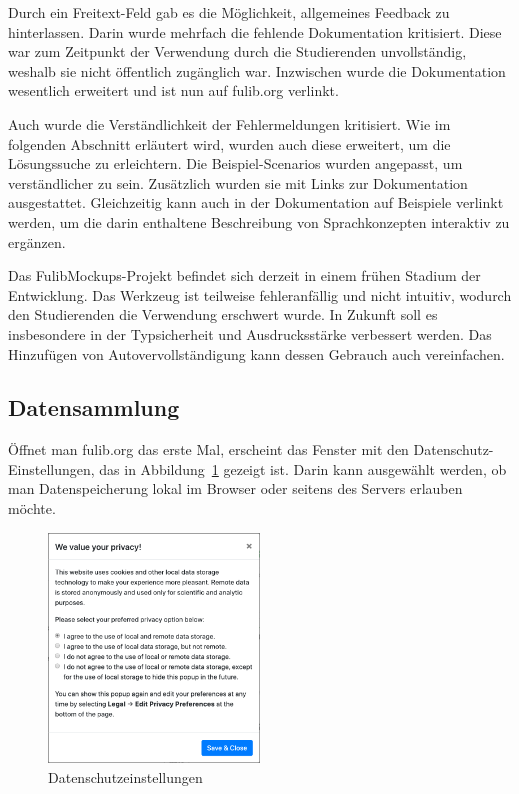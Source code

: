Durch ein Freitext-Feld gab es die Möglichkeit, allgemeines Feedback zu hinterlassen.
Darin wurde mehrfach die fehlende Dokumentation kritisiert.
Diese war zum Zeitpunkt der Verwendung durch die Studierenden unvollständig, weshalb sie nicht öffentlich zugänglich war.
Inzwischen wurde die Dokumentation wesentlich erweitert und ist nun auf fulib.org verlinkt.

Auch wurde die Verständlichkeit der Fehlermeldungen kritisiert.
Wie im folgenden Abschnitt erläutert wird, wurden auch diese erweitert, um die Lösungssuche zu erleichtern.
Die Beispiel-Scenarios wurden angepasst, um verständlicher zu sein.
Zusätzlich wurden sie mit Links zur Dokumentation ausgestattet.
Gleichzeitig kann auch in der Dokumentation auf Beispiele verlinkt werden, um die darin enthaltene Beschreibung von Sprachkonzepten interaktiv zu ergänzen.

Das FulibMockups-Projekt befindet sich derzeit in einem frühen Stadium der Entwicklung.
Das Werkzeug ist teilweise fehleranfällig und nicht intuitiv, wodurch den Studierenden die Verwendung erschwert wurde.
In Zukunft soll es insbesondere in der Typsicherheit und Ausdrucksstärke verbessert werden.
Das Hinzufügen von Autovervollständigung kann dessen Gebrauch auch vereinfachen.

\subsection{Datensammlung}\label{subsec:data-collection}

Öffnet man fulib.org das erste Mal, erscheint das Fenster mit den Datenschutz-Einstellungen, das in Abbildung~\ref{fig:privacy} gezeigt ist.
Darin kann ausgewählt werden, ob man Datenspeicherung lokal im Browser oder seitens des Servers erlauben möchte.

\begin{figure}
    \centering
    \includegraphics[width=0.5\textwidth]{chapter/fulib.org/img/privacy.png}
    \caption{Datenschutzeinstellungen}
    \label{fig:privacy}
\end{figure}

